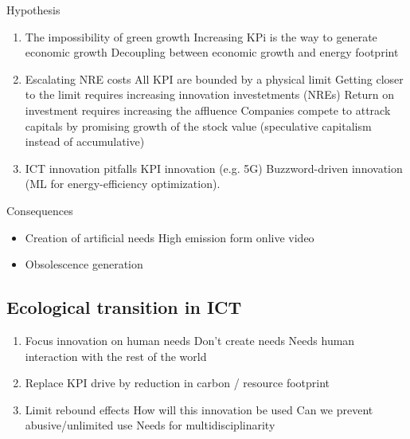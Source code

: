 \begin{itemize}
\bigbreak
Hypothesis
\begin{enumerate}
  \item The impossibility of green growth
    \subitem Increasing KPi is the way to generate economic growth
    \subitem Decoupling between economic growth and energy footprint
  \item Escalating NRE costs
    \subitem All KPI are bounded by a physical limit
    \subitem Getting closer to the limit requires increasing innovation investetments (NREs)
    \subitem Return on investment requires increasing the affluence
    \subitem Companies compete to attrack capitals by promising growth of the stock value (speculative capitalism instead of accumulative)
  \item ICT innovation pitfalls
    \subitem KPI innovation (e.g. 5G)
    \subitem Buzzword-driven innovation (ML for energy-efficiency optimization).
\end{enumerate}


Consequences
\begin{itemize}
  \item Creation of artificial needs
  \subitem High emission form onlive video
  \item Obsolescence generation
\end{itemize}


\end{itemize}

\subsection{Ecological transition in ICT}
\begin{enumerate}
  \item Focus innovation on human needs
    \subitem Don't create needs
    \subitem Needs human interaction with the rest of the world
  \item Replace KPI drive by reduction in carbon / resource footprint
  \item Limit rebound effects
    \subitem How will this innovation be used
    \subitem Can we prevent abusive/unlimited use 
    \subitem Needs for multidisciplinarity
\end{enumerate}




